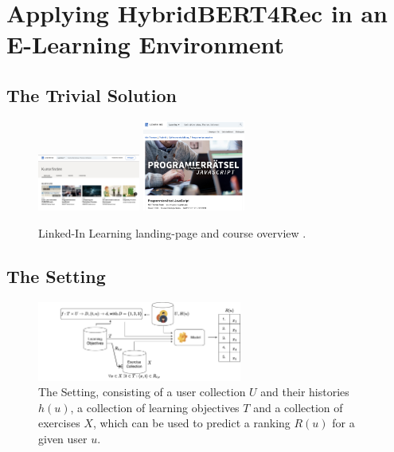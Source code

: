 \documentclass{Academic}
\begin{document}
    \section{Applying HybridBERT4Rec in an E-Learning Environment}

        \subsection{The Trivial Solution}
        \begin{figure}[ht!]
            \centering
			\includegraphics[width=0.3\textwidth]{images/linked_in_landing.pdf}
            \includegraphics[width=0.3\textwidth]{images/linked_in_course.pdf}
			\caption{Linked-In Learning landing-page and course overview \cite{LinkedInLearningMit}.}
            \label{fig:trivSol}
		\end{figure}
    
        \subsection{The Setting}
    \begin{figure}[ht!]
        \centering
        \includegraphics[width=0.6\textwidth]{images/setting.pdf}
        \caption{The Setting, consisting of a user collection $U$ and their histories $h(u)$, a collection of learning objectives $T$ and a collection of exercises $X$, which can be used to predict a ranking $R(u)$ for a given user $u$.}
        \label{fig:setting}
    \end{figure}
\end{document}
